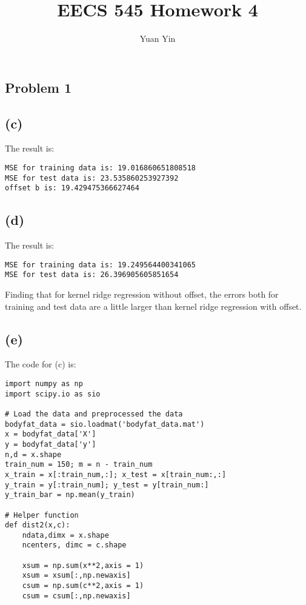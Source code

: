 \documentclass[letterpaper,11pt]{article}
\author{Yuan Yin}
\title{EECS 545 Homework 4}
\begin{document}
\large
\maketitle
\begin{spacing}{1.2}  %
\section*{Problem 1}
\subsection*{(c)}

The result is:
\begin{lstlisting}
MSE for training data is: 19.016860651808518
MSE for test data is: 23.535860253927392
offset b is: 19.429475366627464
\end{lstlisting}

\subsection*{(d)}

The result is:
\begin{lstlisting}
MSE for training data is: 19.249564400341065
MSE for test data is: 26.396905605851654
\end{lstlisting}

Finding that for kernel ridge regression without offset, the errors both for training and test data are a little larger than kernel ridge regression with offset.

\subsection*{(e)}

The code for (c) is:
\begin{lstlisting}
import numpy as np
import scipy.io as sio

# Load the data and preprocessed the data
bodyfat_data = sio.loadmat('bodyfat_data.mat')
x = bodyfat_data['X']
y = bodyfat_data['y']
n,d = x.shape
train_num = 150; m = n - train_num
x_train = x[:train_num,:]; x_test = x[train_num:,:]
y_train = y[:train_num]; y_test = y[train_num:]
y_train_bar = np.mean(y_train)

# Helper function
def dist2(x,c):
    ndata,dimx = x.shape
    ncenters, dimc = c.shape

    xsum = np.sum(x**2,axis = 1)
    xsum = xsum[:,np.newaxis]
    csum = np.sum(c**2,axis = 1)
    csum = csum[:,np.newaxis]


\end{lstlisting}
\end{spacing}
\end{document}
